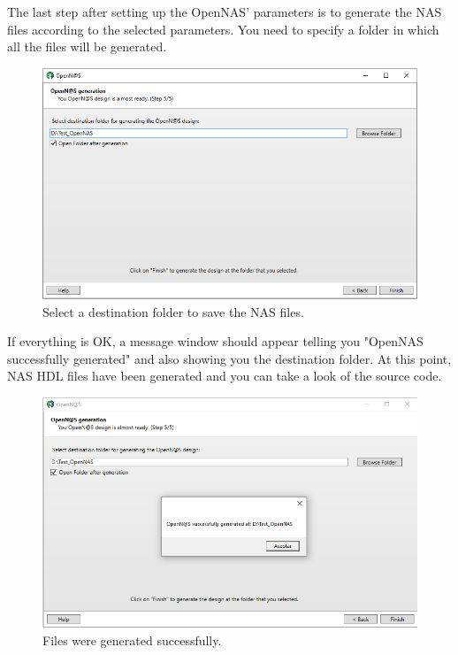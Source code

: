 The last step after setting up the OpenNAS' parameters is to generate the NAS files according to the selected parameters. You need to specify a folder in which all the files will be generated.

\begin{figure}[H]
\centering
\includegraphics[width=1\textwidth]{images/Img24_S5_SaveFiles.PNG}
\caption{\label{fig:OpenNAS_s5_destination_folder}Select a destination folder to save the NAS files.}
\end{figure}

If everything is OK, a message window should appear telling you "OpenNAS successfully generated" and also showing you the destination folder. At this point, NAS HDL files have been generated and you can take a look of the source code.

\begin{figure}[H]
\centering
\includegraphics[width=1\textwidth]{images/Img25_S5_SaveFiles_OK.PNG}
\caption{\label{fig:OpenNAS_s5_success}Files were generated successfully.}
\end{figure}

